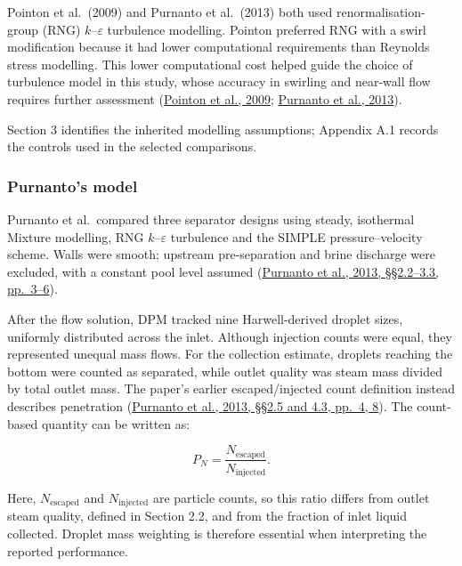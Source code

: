 \documentclass[12pt]{article}
\begin{document}
Pointon et al.~(2009) and Purnanto et al.~(2013) both used renormalisation-group (RNG) \(k\)--\(\varepsilon\) turbulence modelling. Pointon preferred RNG with a swirl modification because it had lower computational requirements than Reynolds stress modelling. This lower computational cost helped guide the choice of turbulence model in this study, whose accuracy in swirling and near-wall flow requires further assessment (\href{https://publications.mygeoenergynow.org/grc/1028587.pdf}{Pointon et al., 2009}; \href{https://www.researchgate.net/publication/269519626_CFD_MODELLING_OF_TWO-PHASE_FLOW_INSIDE_GEOTHERMAL_STEAM-WATER_SEPARATORS}{Purnanto et al., 2013}).

Section 3 identifies the inherited modelling assumptions; Appendix A.1 records the controls used in the selected comparisons.

\subsubsection{Purnanto's model}\label{purnantos-model}

Purnanto et al.~compared three separator designs using steady, isothermal Mixture modelling, RNG \(k\)--\(\varepsilon\) turbulence and the SIMPLE pressure--velocity scheme. Walls were smooth; upstream pre-separation and brine discharge were excluded, with a constant pool level assumed (\href{https://www.researchgate.net/publication/269519626_CFD_MODELLING_OF_TWO-PHASE_FLOW_INSIDE_GEOTHERMAL_STEAM-WATER_SEPARATORS}{Purnanto et al., 2013, §§2.2--3.3, pp.~3--6}).

\par\noindent\begin{minipage}{\linewidth}
After the flow solution, DPM tracked nine Harwell-derived droplet sizes, uniformly distributed across the inlet. Although injection counts were equal, they represented unequal mass flows. For the collection estimate, droplets reaching the bottom were counted as separated, while outlet quality was steam mass divided by total outlet mass. The paper's earlier escaped/injected count definition instead describes penetration (\href{https://www.researchgate.net/publication/269519626_CFD_MODELLING_OF_TWO-PHASE_FLOW_INSIDE_GEOTHERMAL_STEAM-WATER_SEPARATORS}{Purnanto et al., 2013, §§2.5 and 4.3, pp.~4, 8}). The count-based quantity can be written as:

\[
P_N=\frac{N_{\mathrm{escaped}}}{N_{\mathrm{injected}}}.
\tag{2}
\]

Here, \(N_{\mathrm{escaped}}\) and \(N_{\mathrm{injected}}\) are particle counts, so this ratio differs from outlet steam quality, defined in Section 2.2, and from the fraction of inlet liquid collected. Droplet mass weighting is therefore essential when interpreting the reported performance.
\end{minipage}\par\medskip
\end{document}
